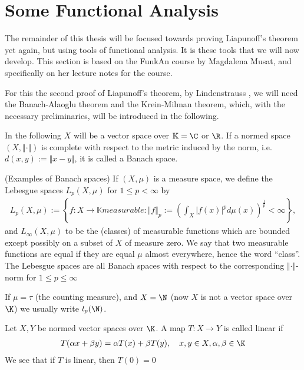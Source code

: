 \section{Some Functional Analysis}

The remainder of this thesis will be focused towards proving Liapunoff's theorem yet again, but using tools of functional analysis. It is these tools that we will now develop. This section is based on the FunkAn course by Magdalena Musat, and specifically on her lecture notes \cite{Musat17} for the course.

For this the second proof of Liapunoff's theorem, by Lindenstrauss \cite{Lindenstrauss66}, we will need the Banach-Alaoglu theorem and the Krein-Milman theorem, which, with the necessary preliminaries, will be introduced in the following.

In the following $X$ will be a vector space over $\mathbb{K}=\C$ or $\R$. If a normed space $(X, \Vert \cdot \Vert)$ is complete with respect to the metric induced by the norm, i.e. $d(x,y):=\Vert x - y \Vert$, it is called a Banach space.

\begin{example}(Examples of Banach spaces)
If $(X, \mu)$ is a measure space, we define the Lebesgue spaces $L_{p}(X, \mu)$ for $1\le p < \infty$ by
\begin{align*}
	L_{p}(X, \mu) := \left\{ f: X \to \mathbb{K} measurable : \Vert f \Vert_{p}:= \left( \int_{X}|f(x)|^{p}d\mu(x) \right)^{\frac{1}{p}} < \infty \right\},
\end{align*}
and $L_{\infty}(X, \mu)$ to be the (classes) of measurable functions which are bounded except possibly on a subset of $X$ of measure zero.
We say that two measurable functions are equal if they are equal $\mu$ almost everywhere, hence the word ``class''.
The Lebesgue spaces are all Banach spaces with respect to the corresponding $\Vert\cdot\Vert$-norm for $1\le p \le \infty$
\end{example}

If $\mu=\tau$ (the counting measure), and $X=\N$ (now $X$ is not a vector space over $\K$) we usually write $l_{p}(\N)$.


\begin{definition}
Let $X,Y$ be normed vector spaces over $\K$. A map $T:X\to Y$ is called linear if
\begin{align*}
	T(\alpha x + \beta y) = \alpha T(x) + \beta T(y), \quad x,y\in X, \alpha,\beta \in \K
\end{align*}
We see that if $T$ is linear, then $T(0)=0$
\end{definition}

